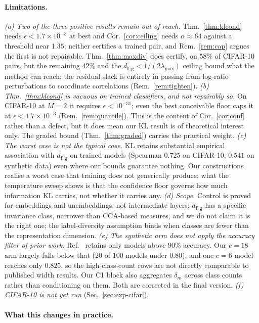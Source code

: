 \documentclass[10pt,letterpaper,twocolumn]{article}
\newcommand{\TODO}[1]{}
\newcommand{\bff}{\mathbf{f}}
\newcommand{\bfg}{\mathbf{g}}
\newcommand{\dfg}{d_{\bff,\bfg}}
\theoremstyle{plain}
\theoremstyle{definition}
\theoremstyle{remark}
\begin{document}
\paragraph{Limitations.}
\emph{(a) Two of the three positive results remain out of reach.}
Thm.~\ref{thm:klcond} needs $\epsilon<1.7\times10^{-3}$ at best and
Cor.~\ref{cor:ceiling} needs $\alpha\approx64$ against a threshold near
$1.35$; neither certifies a trained pair, and Rem.~\ref{rem:cap} argues the
first is not repairable. Thm.~\ref{thm:maxdiv} does certify, on $58\%$ of
CIFAR-10 pairs, but the remaining $42\%$ and the
$\dfg<1/(2\lambda_{\max})$ ceiling bound what the method can reach; the
residual slack is entirely in passing from log-ratio perturbations to
coordinate correlations (Rem.~\ref{rem:tighten}).
\emph{(b) Thm.~\ref{thm:klcond} is vacuous on trained classifiers, and not
repairably so.} On CIFAR-10 at $M=2$ it requires $\epsilon<10^{-31}$; even the
best conceivable floor caps it at $\epsilon<1.7\times10^{-3}$
(Rem.~\ref{rem:quantile}). This is the content of Cor.~\ref{cor:conf} rather
than a defect, but it does mean our KL result is of theoretical interest only.
The graded bound (Thm.~\ref{thm:graded}) carries the practical weight.
\emph{(c) The worst case is not the typical case.} KL retains substantial
empirical association with $\dfg$ on trained models (Spearman $0.725$ on
CIFAR-10, $0.541$ on synthetic data) even where our bounds guarantee nothing.
Our constructions realise a worst case that training does not generically
produce; what the temperature sweep shows is that the confidence floor governs
how much information KL carries, not whether it carries any.
\emph{(d) Scope.} Control is proved for embeddings and unembeddings, not
intermediate layers; $\dfg$ has a specific invariance class, narrower than
CCA-based measures, and we do not claim it is the right one; the
label-diversity assumption binds when classes are fewer than the representation
dimension.
\emph{(e) The synthetic arm does not apply the accuracy filter of prior work.}
Ref.~\cite{roeder2021} retains only models above $90\%$ accuracy. Our $c{=}18$
arm largely falls below that ($20$ of $100$ models under $0.80$), and one
$c{=}6$ model reaches only $0.825$, so the high-class-count rows are not
directly comparable to published width results. Our C1 block also aggregates
$\delta_{m}$ across class counts rather than conditioning on them.
Both are corrected in the final version.
\emph{(f) CIFAR-10 is not yet run} (Sec.~\ref{sec:exp-cifar}).

\paragraph{What this changes in practice.}
\TODO{Report $\delta$ alongside any KL-based similarity claim; prefer
high-order or max-divergence when comparing confident models; treat matched loss
as necessary but far from sufficient for matched representations.}
\end{document}
